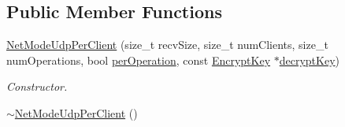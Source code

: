 \subsection*{Public Member Functions}
\begin{DoxyCompactItemize}
\item 
\hyperlink{class_net_mode_udp_per_client_aa3313f3ac3e65b4807d0ebe122ac3b40}{NetModeUdpPerClient} (size\_\-t recvSize, size\_\-t numClients, size\_\-t numOperations, bool \hyperlink{class_net_mode_udp_per_client_a08a0bc34d06354add6d22f504ccfdaf7}{perOperation}, const \hyperlink{class_encrypt_key}{EncryptKey} $\ast$\hyperlink{class_net_mode_udp_per_client_a6526b99fd75abe001e6e92e1e8bcd1e3}{decryptKey})
\begin{DoxyCompactList}\small\item\em Constructor. \item\end{DoxyCompactList}\item 
\hypertarget{class_net_mode_udp_per_client_a2002c87f02fb59e232dea6889cb06308}{
\hyperlink{class_net_mode_udp_per_client_a2002c87f02fb59e232dea6889cb06308}{$\sim$NetModeUdpPerClient} ()}
\label{class_net_mode_udp_per_client_a2002c87f02fb59e232dea6889cb06308}


\end{DoxyCompactItemize}
